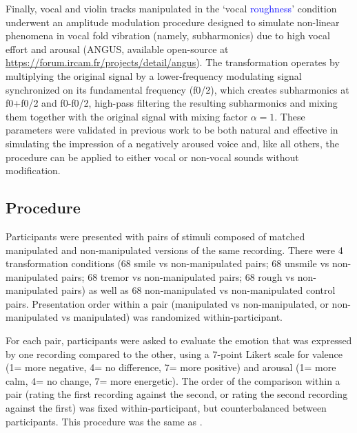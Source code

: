 \documentclass[openacc]{rsprocb_new}%
\begin{document}
Finally, vocal and violin tracks manipulated in the `vocal \textcolor{blue}{roughness}' condition underwent an amplitude modulation procedure designed to simulate non-linear phenomena in vocal fold vibration (namely, subharmonics) due to high vocal effort and arousal (ANGUS\cite{LIU20}, available open-source at \url{https://forum.ircam.fr/projects/detail/angus}). The transformation operates by multiplying the original signal by a lower-frequency modulating signal synchronized on its fundamental frequency (f0/2), which creates subharmonics at f0+f0/2 and f0-f0/2, high-pass filtering the resulting subharmonics and mixing them together with the original signal with mixing factor $\alpha=1$. These parameters were validated in previous work to be both natural and effective in simulating the impression of a negatively aroused voice \cite{LIU20} and, like all others, the procedure can be applied to either vocal or non-vocal sounds without modification.

\subsection*{Procedure} 

Participants were presented with pairs of stimuli composed of matched manipulated and non-manipulated versions of the same recording. There were 4 transformation conditions (68 smile vs non-manipulated pairs; 68 unsmile vs non-manipulated pairs; 68 tremor vs non-manipulated pairs; 68 rough vs non-manipulated pairs) as well as 68 non-manipulated vs non-manipulated control pairs. Presentation order within a pair (manipulated vs non-manipulated, or non-manipulated vs manipulated) was randomized within-participant. 

For each pair, participants were asked to evaluate the emotion that was expressed by one recording compared to the other, using a 7-point Likert scale for valence (1= more negative, 4= no difference, 7= more positive) and arousal (1= more calm, 4= no change, 7= more energetic). The order of the comparison within a pair (rating the first recording against the second, or rating the second recording against the first) was fixed within-participant, but counterbalanced between participants. This procedure was the same as \cite{MA15}. 
\end{document}
